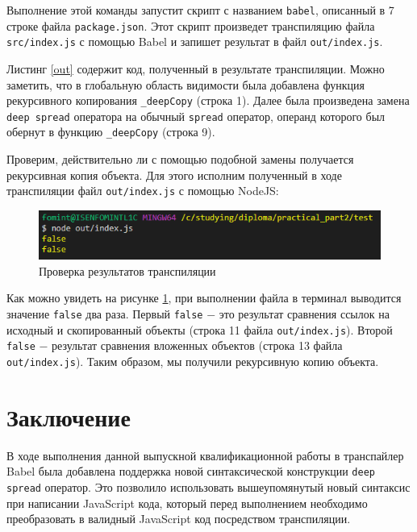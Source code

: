 \documentclass[14pt, a4paper]{article}
\def\code#1{\texttt{#1}} %
\begin{document}
Выполнение этой команды запустит скрипт с названием \code{babel}, описанный в 7 строке файла 
\code{package.json}. Этот скрипт произведет транспиляцию файла \code{src/index.js} с помощью Babel и 
запишет результат в файл \code{out/index.js}. 



Листинг \ref{out} содержит код, полученный в результате транспиляции. Можно заметить, что в глобальную
область видимости была добавлена функция рекурсивного копирования \code{\_deepCopy} (строка 1). 
Далее была произведена замена \code{deep spread} оператора на обычный \code{spread} оператор, операнд
которого был обернут в функцию \code{\_deepCopy} (строка 9). 

Проверим, действительно ли с помощью подобной замены получается рекурсивная копия объекта. Для этого
исполним полученный в ходе транспиляции файл \code{out/index.js} с помощью NodeJS:

\begin{figure}[H]
  \centering
  \includegraphics[scale=1.0]{img/test_results.PNG}
  \caption{Проверка результатов транспиляции}
  \label{test_results}
\end{figure}
Как можно увидеть на рисунке \ref{test_results}, при выполнении файла в терминал выводится значение 
\code{false} два раза. Первый \code{false} $-$ это результат сравнения ссылок на исходный и 
скопированный объекты (строка 11 файла \code{out/index.js}). Второй \code{false} $-$ результат сравнения
вложенных объектов (строка 13 файла \code{out/index.js}). Таким образом, мы получили рекурсивную копию
объекта. 

\pagebreak
\section{Заключение}
В ходе выполнения данной выпускной квалификационной работы в транспайлер Babel была добавлена 
поддержка новой синтаксической конструкции \code{deep spread} оператор. Это позволило использовать 
вышеупомянутый новый синтаксис при написании JavaScript кода, который перед выполнением необходимо 
преобразовать в валидный JavaScript код посредством транспиляции. 
\end{document}
